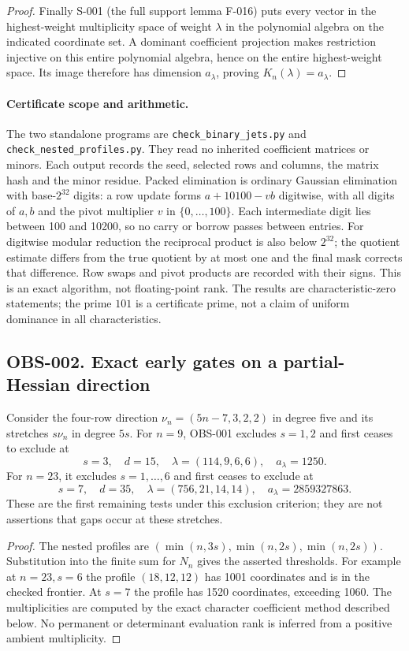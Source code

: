 \begin{proof}
Finally S-001 (the full support lemma F-016) puts every vector in the
highest-weight multiplicity space of weight $\lambda$ in the polynomial
algebra on the indicated coordinate set. A dominant coefficient
projection makes restriction injective on this entire polynomial
algebra, hence on the entire highest-weight space. Its image therefore
has dimension $a_\lambda$, proving $K_n(\lambda)=a_\lambda$.
\end{proof}

\paragraph{Certificate scope and arithmetic.}
The two standalone programs are \texttt{check\_binary\_jets.py} and
\texttt{check\_nested\_profiles.py}. They read no inherited coefficient
matrices or minors. Each output records the seed, selected rows and
columns, the matrix hash and the minor residue. Packed elimination is
ordinary Gaussian elimination with base-$2^{32}$ digits: a row update
forms $a+10100-vb$ digitwise, with all digits of $a,b$ and the pivot
multiplier $v$ in $\{0,\ldots,100\}$. Each intermediate digit lies
between 100 and 10200, so no carry or borrow passes between entries.
For digitwise modular reduction the reciprocal product is also below
$2^{32}$; the quotient estimate differs from the true quotient by at
most one and the final mask corrects that difference.
Row swaps and pivot products are recorded
with their signs. This is an exact algorithm, not floating-point rank.
The results are characteristic-zero statements; the prime $101$ is a
certificate prime, not a claim of uniform dominance in all
characteristics.

\subsection{OBS-002. Exact early gates on a partial-Hessian direction}
Consider the four-row direction
$\nu_n=(5n-7,3,2,2)$ in degree five and its stretches
$s\nu_n$ in degree $5s$. For $n=9$, OBS-001 excludes $s=1,2$ and
first ceases to exclude at
\[
 s=3,\quad d=15,\quad \lambda=(114,9,6,6),\quad a_\lambda=1250.
\]
For $n=23$, it excludes $s=1,\ldots,6$ and first ceases to exclude at
\[
 s=7,\quad d=35,\quad \lambda=(756,21,14,14),
 \quad a_\lambda=2859327863.
\]
These are the first remaining tests under this exclusion criterion;
they are not assertions that gaps occur at these stretches.

\begin{proof}
The nested profiles are $(\min(n,3s),\min(n,2s),\min(n,2s))$.
Substitution into the finite sum for $N_n$ gives the asserted thresholds.
For example at $n=23,s=6$ the profile $(18,12,12)$ has 1001 coordinates
and is in the checked frontier. At $s=7$ the profile has 1520 coordinates,
exceeding 1060. The multiplicities are computed by the exact character
coefficient method described below. No permanent or determinant
evaluation rank is inferred from a positive ambient multiplicity.
\end{proof}


